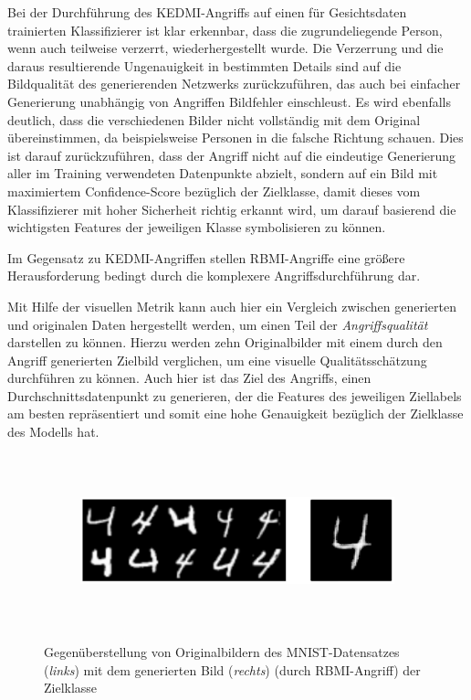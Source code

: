 Bei der Durchführung des \glqq KEDMI\grqq-Angriffs auf einen für Gesichtsdaten trainierten Klassifizierer ist klar erkennbar, dass die zugrundeliegende Person, wenn auch teilweise verzerrt, wiederhergestellt wurde. Die Verzerrung und die daraus resultierende Ungenauigkeit in bestimmten Details sind auf die Bildqualität des generierenden Netzwerks zurückzuführen, das auch bei einfacher Generierung unabhängig von Angriffen Bildfehler einschleust. Es wird ebenfalls deutlich, dass die verschiedenen Bilder nicht vollständig mit dem Original übereinstimmen, da beispielsweise Personen in die \glqq falsche\grqq{} Richtung schauen. Dies ist darauf zurückzuführen, dass der Angriff nicht auf die eindeutige Generierung aller im Training verwendeten Datenpunkte abzielt, sondern auf ein Bild mit maximiertem Confidence-Score bezüglich der Zielklasse, damit dieses vom Klassifizierer mit hoher Sicherheit richtig erkannt wird, um darauf basierend die wichtigsten Features der jeweiligen Klasse symbolisieren zu können. 

Im Gegensatz zu \glqq KEDMI\grqq-Angriffen stellen \glqq RBMI\grqq-Angriffe eine größere Herausforderung bedingt durch die komplexere Angriffsdurchführung dar. 

Mit Hilfe der visuellen Metrik kann auch hier ein Vergleich zwischen generierten und originalen Daten hergestellt werden, um einen Teil der \textit{Angriffsqualität} darstellen zu können. Hierzu werden zehn Originalbilder mit einem durch den Angriff generierten Zielbild verglichen, um eine visuelle Qualitätsschätzung durchführen zu können. Auch hier ist das Ziel des Angriffs, einen \glqq Durchschnittsdatenpunkt\grqq{} zu generieren, der die Features des jeweiligen Ziellabels am besten repräsentiert und somit eine hohe Genauigkeit bezüglich der Zielklasse des Modells hat. 

\begin{figure}[H]
	\centering
	\begin{subfigure}[b]{0.8\linewidth}
		\includegraphics[width=\linewidth, height=5cm, keepaspectratio]{Bilder/4_mnist_rbmi.png}
	\end{subfigure}
	\caption{Gegenüberstellung von Originalbildern des MNIST-Datensatzes (\textit{links}) mit dem generierten Bild (\textit{rechts}) (durch \glqq RBMI\grqq-Angriff) der Zielklasse \grqq{}}
	\label{img:rbmi_visual_mnist}
\end{figure}

